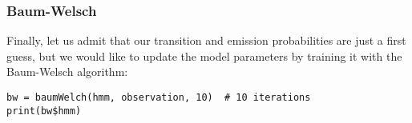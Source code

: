 \documentclass[a4paper,11pt]{article}
\begin{document}
\subsubsection{Baum-Welsch}

Finally, let us admit that our transition and emission probabilities are just a first guess, but we would like to update the model parameters by training it with the Baum-Welsch algorithm:

\begin{verbatim}
bw = baumWelch(hmm, observation, 10)  # 10 iterations
print(bw$hmm)
\end{verbatim}
\end{document}
